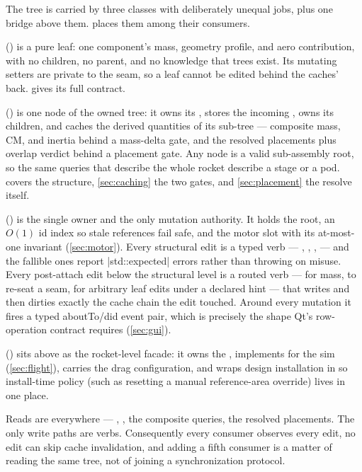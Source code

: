 The tree is carried by three classes with deliberately unequal jobs, plus one bridge above them.
 places them among their consumers.

\textbf{} () is a pure leaf: one component's mass,
geometry profile, and aero contribution, with no children, no parent, and no knowledge that trees
exist. Its mutating setters are private to the  seam, so a leaf cannot be edited
behind the caches' back.  gives its full contract.

\textbf{} () is one node of the owned tree: it
owns its , stores the incoming , owns its children, and caches the
derived quantities of its sub-tree --- composite mass, CM, and inertia behind a mass-delta gate,
and the resolved placements plus overlap verdict behind a placement gate. Any node is a valid
sub-assembly root, so the same queries that describe the whole rocket describe a stage or a pod.
 covers the structure, \cref{sec:caching} the two gates, and \cref{sec:placement}
the resolve itself.

\textbf{} () is the single owner and the only
mutation authority. It holds the root, an $O(1)$ id index so stale references fail safe, and the
motor slot with its at-most-one invariant (\cref{sec:motor}). Every structural edit is a typed
verb --- , , ,  --- and the
fallible ones report \cppinline|std::expected| errors rather than throwing on misuse. Every
post-attach edit below the structural level is a routed verb ---  for mass,
 to re-seat a seam,  for arbitrary leaf edits under a declared
hint --- that writes and then dirties exactly the cache chain the edit touched. Around every mutation it fires a typed aboutTo/did event
pair, which is precisely the shape Qt's row-operation contract requires (\cref{sec:gui}).

\textbf{} () sits above as the rocket-level
facade: it owns the , implements  for the sim
(\cref{sec:flight}), carries the drag configuration, and wraps design installation in
 so install-time policy (such as resetting a manual reference-area override)
lives in one place.

\begin{designrule}
Reads are  everywhere --- , , the composite queries, the
resolved placements. The only write paths are  verbs. Consequently every consumer
observes every edit, no edit can skip cache invalidation, and adding a fifth consumer is a matter
of reading the same tree, not of joining a synchronization protocol.
\end{designrule}

